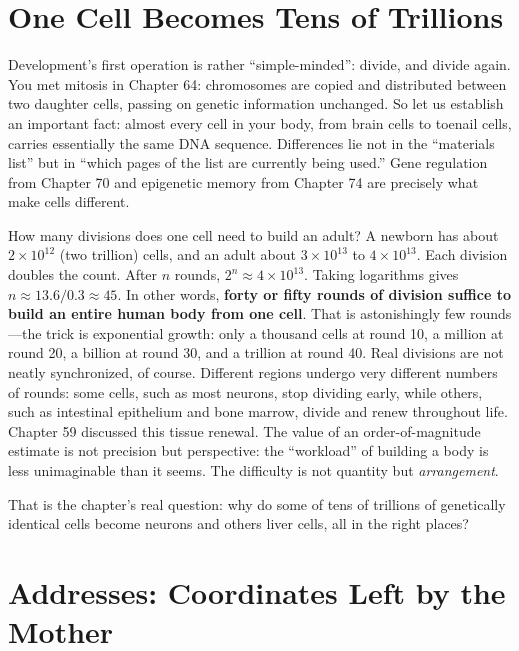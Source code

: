 \section{One Cell Becomes Tens of Trillions}

Development's first operation is rather ``simple-minded'': divide, and divide again. You met mitosis in Chapter 64: chromosomes are copied and distributed between two daughter cells, passing on genetic information unchanged. So let us establish an important fact: almost every cell in your body, from brain cells to toenail cells, carries essentially the same DNA sequence. Differences lie not in the ``materials list'' but in ``which pages of the list are currently being used.'' Gene regulation from Chapter 70 and epigenetic memory from Chapter 74 are precisely what make cells different.

\begin{qiaoliang}
How many divisions does one cell need to build an adult? A newborn has about $2\times 10^{12}$ (two trillion) cells, and an adult about $3\times 10^{13}$ to $4\times 10^{13}$. Each division doubles the count. After $n$ rounds, $2^n \approx 4\times 10^{13}$. Taking logarithms gives $n \approx 13.6/0.3 \approx 45$. In other words, \textbf{forty or fifty rounds of division suffice to build an entire human body from one cell}. That is astonishingly few rounds---the trick is exponential growth: only a thousand cells at round 10, a million at round 20, a billion at round 30, and a trillion at round 40. Real divisions are not neatly synchronized, of course. Different regions undergo very different numbers of rounds: some cells, such as most neurons, stop dividing early, while others, such as intestinal epithelium and bone marrow, divide and renew throughout life. Chapter 59 discussed this tissue renewal. The value of an order-of-magnitude estimate is not precision but perspective: the ``workload'' of building a body is less unimaginable than it seems. The difficulty is not quantity but \emph{arrangement}.
\end{qiaoliang}

That is the chapter's real question: why do some of tens of trillions of genetically identical cells become neurons and others liver cells, all in the right places?

\section{Addresses: Coordinates Left by the Mother}

